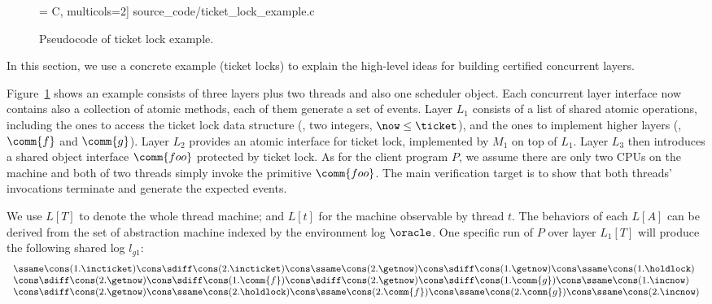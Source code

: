 \begin{figure}
 = C, multicols=2] {source_code/ticket_lock_example.c}
\vspace{-5pt}
\caption{Pseudocode of ticket lock example.}
\label{fig:exp:ticket_lock_example}
\vspace{-10pt}
\end{figure}

In this section, we use a concrete example (ticket locks) to explain
the high-level ideas for building certified concurrent layers.

Figure~\ref{fig:exp:ticket_lock_example} shows an example consists of three layers plus two threads
and also one scheduler object.
Each concurrent layer interface now contains also a collection
of atomic methods, each of them generate a set of events.
Layer $L_1$ consists of a list of shared atomic operations,
including the ones to access the ticket lock
data structure (\ie, two integers, 
$\now \le \ticket$),
and the ones to implement higher layers
(\ie, $\comm{f}$ and $\comm{g}$).
Layer $L_2$ provides an atomic interface
for ticket lock, implemented by $M_1$ on top of $L_1$.
Layer $L_3$ then introduces a shared object
interface $\comm{foo}$ 
protected by ticket lock.
As for the client program $P$,
we assume there are only two CPUs on the machine
and both of two threads simply invoke the primitive $\comm{foo}$.
The main verification target is to show
that both threads' invocations terminate
and generate the expected events.


We use $L[T]$ to denote the whole thread machine;
and $L[t]$ for the machine observable by thread $t$.
The behaviors of each $L[A]$ can be derived from the set of abstraction
machine indexed by the environment log $\oracle$. 
One specific run of $P$ over layer $L_1[T]$ will produce the following
shared log $l_{g1}$:
{\small
\[
\begin{array}{l}
\ssame \cons (1.\incticket) \cons
\sdiff \cons (2.\incticket) \cons
\ssame \cons (2.\getnow) \cons
\sdiff \cons (1.\getnow) \cons
\ssame \cons (1.\holdlock) 
\\
\cons 
\sdiff \cons (2.\getnow) \cons
\sdiff \cons (1.\comm{f}) \cons
\sdiff \cons (2.\getnow) \cons
\sdiff \cons (1.\comm{g}) \cons
\ssame \cons (1.\incnow) 
\\
\cons \sdiff \cons (2.\getnow) \cons
\ssame \cons (2.\holdlock) \cons
\ssame \cons (2.\comm{f}) \cons
\ssame \cons (2.\comm{g}) \cons
\ssame \cons (2.\incnow) 
\end{array}
\]
}

